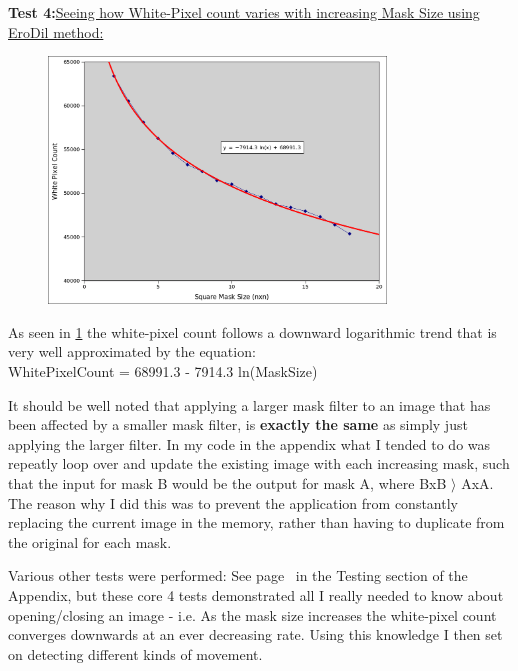 \documentclass[11pt]{article} %
\begin{document}
{{\pagebreak
{\hspace{-20pt} \bf Test 4:}{\underline {Seeing how White-Pixel count varies with increasing Mask Size using EroDil method:}}
\begin{figure}[H]
	\vspace{0pt}
	\begin{center}
		\includegraphics[width=0.8\textwidth]{../images/ImageOps/chartMask}
		\caption{}
		\label{img:maskChart}
	\end{center}
\end{figure}
As seen in \cref{img:maskChart} the white-pixel count follows a downward logarithmic trend that is very well approximated by the equation:\\
WhitePixelCount = 68991.3 - 7914.3 ln(MaskSize)

It should be well noted that applying a larger mask filter to an image that has been affected by a smaller mask filter, is {\bf exactly the same} as simply just applying the larger filter.  In my code in the appendix what I tended to do was repeatly loop over and update the existing image with each increasing mask, such that the input for mask B would be the output for mask A, where BxB \(\rangle\) AxA.  The reason why I did this was to prevent the application from constantly replacing the current image in the memory, rather than having to duplicate from the original for each mask.

Various other tests were performed: See page~\pageref{append:tests} in the Testing section of the Appendix, but these core 4 tests demonstrated all I really needed to know about opening/closing an image - i.e. As the mask size increases the white-pixel count converges downwards at an ever decreasing rate. Using this knowledge I then set on detecting different kinds of movement.

}}
\end{document}
